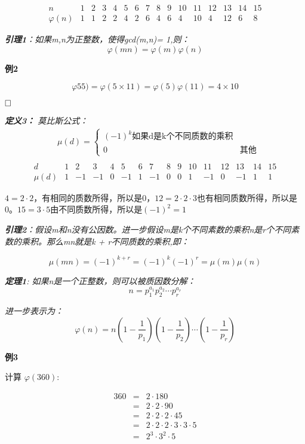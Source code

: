 \documentclass{article}
\begin{document}
$$
\begin{array}{c|ccccccccccccccc}
n & 1 & 2 & 3 & 4 & 5 & 6 & 7 & 8 & 9 & 10 & 11 & 12 & 13 & 14 & 15 \\
\hline \varphi(n) & 1 & 1 & 2 & 2 & 4 & 2 & 6 & 4 & 6 & 4 & 10 & 4 & 12 & 6 & 8
\end{array}
$$

\textit{\textbf{引理1}：如果m,n为正整数，使得gcd(m,n)= 1,则：}
$$\varphi(mn) = \varphi(m)\varphi(n)$$

\textbf{例2}

$$\varphi55) = \varphi(5 \times 11) = \varphi(5)\varphi(11) = 4 \times 10$$


$\hfill\square$ 

\textit{\textbf{定义3：} 莫比斯公式：
$$
\begin{aligned}
&\mu(d)=\left\{\begin{array}{ll}
(-1)^{k} \mbox{如果d是k个不同质数的乘积} \\
0 & \mbox{其他} 
\end{array}\right.\\
\end{aligned}
$$
$$
\begin{array}{c|ccccccccccccccc}
d & 1 & 2 & 3 & 4 & 5 & 6 & 7 & 8 & 9 & 10 & 11 & 12 & 13 & 14 & 15 \\
\hline \mu(d) & 1 & -1 & -1 & 0 & -1 & 1 & -1 & 0 & 0 & 1 & -1 & 0 & -1 & 1 & 1
\end{array}
$$
}

$4 = 2 \cdot 2$，有相同的质数所得，所以是0，$12 = 2 \cdot 2 \cdot 3$也有相同质数所得，所以是0。$15 = 3 \cdot 5$由不同质数所得，所以是$(-1)^2 = 1$

\textit{\textbf{引理2}：假设m和n没有公因数。进一步假设m是k个不同素数的乘积n是r个不同素数的乘积。那么mn就是k + r不同质数的乘积,即：
}

$$\mu(mn) = (-1)^{k+r} = (-1)^k(-1)^r = \mu(m)\mu(n)$$

\textit{\textbf{定理1}: 如果n是一个正整数，则可以被质因数分解：}
$$n = p_1^{a_1}p_2^{a_2}\cdots p_r^{a_r}$$

\textit{进一步表示为：}
$$\varphi(n) = n \left(1 - \frac{1}{p_1} \right)\left(1 - \frac{1}{p_2}\right) \cdots \left(1 - \frac{1}{p_r}\right)$$


\textbf{例3}

计算 $\varphi(360)$:


\begin{eqnarray}   
\label{eq}
360&=& 2 \cdot 180  \nonumber \\ 
&=&  2  \cdot 2 \cdot 90 \nonumber \\ 
&=& 2  \cdot 2  \cdot 2  \cdot 45  \nonumber \\ 
&=& 2  \cdot 2  \cdot 2  \cdot 3  \cdot 3 \cdot 5 \nonumber \\ 
&=& 2^3 \cdot 3^2 \cdot 5 \nonumber \\ 
\nonumber 
\end{eqnarray}
\end{document}
